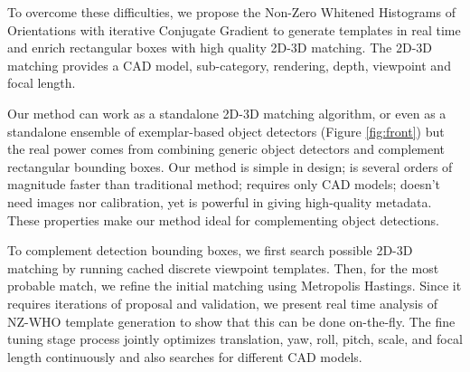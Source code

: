 To overcome these difficulties, we propose the Non-Zero Whitened Histograms of Orientations with iterative Conjugate Gradient to generate templates in real time and enrich rectangular boxes with high quality 2D-3D matching. The 2D-3D matching provides a CAD model, sub-category, rendering, depth, viewpoint and focal length.

Our method can work as a standalone 2D-3D matching algorithm, or even as a standalone ensemble of exemplar-based object detectors (Figure \ref{fig:front}) but the real power comes from combining generic object detectors and complement rectangular bounding boxes. Our method is simple in design; is several orders of magnitude faster than traditional method; requires only CAD models; doesn't need images nor calibration, yet is powerful in giving high-quality metadata. These properties make our method ideal for complementing object detections. 

To complement detection bounding boxes, we first search possible 2D-3D matching by running cached discrete viewpoint templates. Then, for the most probable match, we refine the initial matching using Metropolis Hastings. Since it requires iterations of proposal and validation, we present real time analysis of NZ-WHO template generation to show that this can be done on-the-fly. The fine tuning stage process jointly optimizes translation, yaw, roll, pitch, scale, and focal length continuously and also searches for different CAD models.



